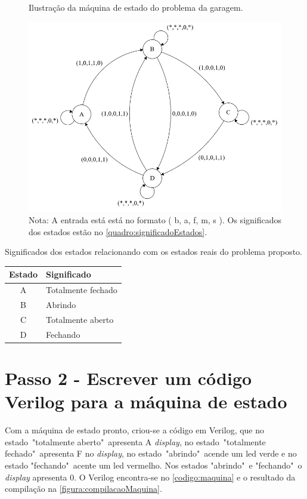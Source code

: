		\begin{figure}[H]
			 \centering
			 \caption{\label{figura:maquinaDeEstado}Ilustração da máquina de estado do problema da garagem.}
			 \includegraphics[width=1\textwidth]{img/maquina/maquinaEstado}
			 \caption*{Nota: A entrada está está no formato ( b, a, f, m, s ). Os
			  significados dos estados estão no \autoref{quadro:significadoEstados}.}
		\end{figure}

		\begin{quadro}[H]
			\centering
			\caption{Significados dos estados relacionando com os estados reais do problema proposto.}
			\label{quadro:significadoEstados}
			\begin{tabular}{|c|l|}
			  \hline
			   \textbf{Estado} & \textbf{Significado}\\
			    \hline
				   A & Totalmente fechado \\
			   	\hline
			   		B & Abrindo \\
			    \hline
					C & Totalmente aberto \\
			    \hline
			    	D & Fechando \\
			    \hline
			\end{tabular}
		\end{quadro}

	\section{Passo 2 - Escrever um código Verilog para a máquina de estado}
		Com a máquina de estado pronto, criou-se a código em Verilog, que no
		estado\ "totalmente aberto"\ apresenta A \textit{display}, no estado\ "totalmente fechado"\
		apresenta F no \textit{display}, no estado\ "abrindo"\ acende um \ac{led} verde e no
		estado "fechando"\ acente um \ac{led} vermelho. Nos estados "abrindo"\ e "fechando"\ o
		\textit{display} apresenta 0. O Verilog encontra-se no \autoref{codigo:maquina} e o resultado da
		compilação na \autoref{figura:compilacaoMaquina}.

